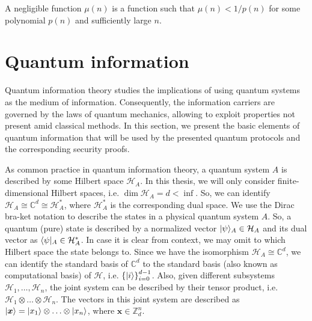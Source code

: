 A negligible function $\mu(n)$ is a function such that $\mu(n) < 1/p(n)$ for some polynomial $p(n)$ and sufficiently large $n$.




\section{Quantum information}

Quantum information theory studies the implications of using quantum systems as the medium of information. Consequently, the information carriers are governed by the laws of quantum mechanics, allowing to exploit properties not present amid classical methods. In this section, we present the basic elements of quantum information that will be used by the presented quantum protocols and the corresponding security proofs.

As common practice in quantum information theory, a quantum system $A$ is described by some Hilbert space $\mathcal{H}_A$. In this thesis, we will only consider finite-dimensional Hilbert spaces, i.e. $\dim \mathcal{H}_A = d < \inf$. So, we can identify $\mathcal{H}_A \cong \mathbb{C}^d \cong \mathcal{H}^{*}_A$, where $\mathcal{H}^{*}_A$ is the corresponding dual space. We use the Dirac bra-ket notation to describe the states in a physical quantum system $A$. So, a quantum (pure) state is described by a normalized vector $| \psi \rangle_A\in\mathcal{H}_A$ and its dual vector as $\langle \psi |_A\in\mathcal{H}^{*}_A$. In case it is clear from context, we may omit to which Hilbert space the state belongs to. Since we have the isomorphism $\mathcal{H}_A \cong \mathbb{C}^d$, we can identify the standard basis of $\mathbb{C}^d$ to the standard basis (also known as computational basis) of $\mathcal{H}$, i.e. $\left\{ | i \rangle \right\}_{i=0}^{d-1}$. Also, given different subsystems $\mathcal{H}_1, \ldots, \mathcal{H}_n$, the joint system can be described by their tensor product, i.e. $\mathcal{H}_1 \otimes \ldots \otimes \mathcal{H}_n$. The vectors in this joint system are described as $| \bm{x} \rangle = | x_1 \rangle \otimes \ldots \otimes | x_n \rangle$, where $\bm{x} \in \mathbb{Z}_d^n$.

